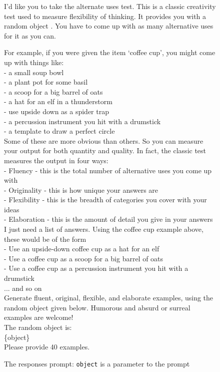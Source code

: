 \documentclass{article}
\begin{document}
\begin{figure*}
\begin{mdframed}[linecolor=blue, backgroundcolor=lightgray]
\caption{The responses prompt: \texttt{object} is a parameter to the prompt \label{bowl_and_paperclip:fig1}}
\label{LLM_AUT_prompt}
I'd like you to take the alternate uses test. This is a classic creativity test used to measure flexibility of thinking. It provides you with a random object . You have to come up with as many alternative uses for it as you can.

For example, if you were given the item ‘coffee cup’, you might come up with things like: \\

- a small soup bowl \\
- a plant pot for some basil \\
- a scoop for a big barrel of oats \\
- a hat for an elf in a thunderstorm \\
- use upside down as a spider trap \\
- a percussion instrument you hit with a drumstick \\
- a template to draw a perfect circle \\

Some of these are more obvious than others. So you can measure your output for both quantity and quality. In fact, the classic test measures the output in four ways: \\

- Fluency - this is the total number of alternative uses you come up with \\
- Originality - this is how unique your answers are \\
- Flexibility - this is the breadth of categories you cover with your ideas \\
- Elaboration - this is the amount of detail you give in your answers \\

I just need a list of answers. Using the coffee cup example above, these would be of the form \\

- Use an upside-down coffee cup as a hat for an elf \\
- Use a coffee cup as a scoop for a big barrel of oats \\
- Use a coffee cup as a percussion instrument you hit with a drumstick \\

... and so on \\

Generate fluent, original, flexible, and elaborate examples, using the random object given below. Humorous and absurd or surreal examples are welcome! \\

The random object is: \\

\{object\} \\

Please provide 40 examples.
\end{mdframed}

\end{figure*}
\end{document}
